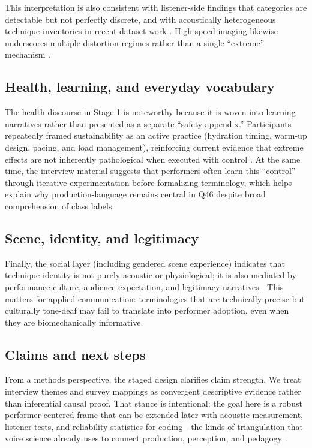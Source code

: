 \documentclass{article}
\begin{document}
This interpretation is also consistent with listener-side findings that categories are detectable but not perfectly discrete, and with acoustically heterogeneous technique inventories in recent dataset work \parencite{Pinto2023VocalEffects,Tailleur2021AcousticSpace,tailleur2024emvddatasetdatasetextreme,Tailleur2024EMVD}.
High-speed imaging likewise underscores multiple distortion regimes rather than a single ``extreme'' mechanism \parencite{Lee2025VocalDistortion}.

\subsection*{Health, learning, and everyday vocabulary}
The health discourse in Stage 1 is noteworthy because it is woven into learning narratives rather than presented as a separate ``safety appendix.''
Participants repeatedly framed sustainability as an active practice (hydration timing, warm-up design, pacing, and load management), reinforcing current evidence that extreme effects are not inherently pathological when executed with control \parencite{Aaen2024ExtremeVocalEffects,Guzman2018MetalSinging,blomgren1998vocalfry}.
At the same time, the interview material suggests that performers often learn this ``control'' through iterative experimentation before formalizing terminology, which helps explain why production-language remains central in Q46 despite broad comprehension of class labels.

\subsection*{Scene, identity, and legitimacy}
Finally, the social layer (including gendered scene experience) indicates that technique identity is not purely acoustic or physiological; it is also mediated by performance culture, audience expectation, and legitimacy narratives \parencite{Herbst2017VoiceOfAnarchy,Wallmark2018SoundOfEvil,Ribaldini2019Terminology}.
This matters for applied communication: terminologies that are technically precise but culturally tone-deaf may fail to translate into performer adoption, even when they are biomechanically informative.

\subsection*{Claims and next steps}
From a methods perspective, the staged design clarifies claim strength.
We treat interview themes and survey mappings as convergent descriptive evidence rather than inferential causal proof.
That stance is intentional: the goal here is a robust performer-centered frame that can be extended later with acoustic measurement, listener tests, and reliability statistics for coding---the kinds of triangulation that voice science already uses to connect production, perception, and pedagogy \parencite{Aaen2024ExtremeVocalEffects,Pinto2023VocalEffects}.
\end{document}
